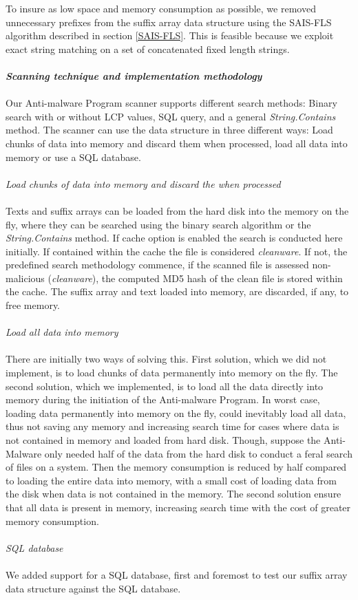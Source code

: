 \documentclass[12pt]{article} %
\begin{document}
To insure as low space and memory consumption as possible, we removed unnecessary prefixes from the suffix array data structure using the SAIS-FLS algorithm described in section \ref{SAIS-FLS}. This is feasible because we exploit exact string matching on a set of concatenated fixed length strings. 
\\ \\
\textbf{\emph{Scanning technique and implementation methodology}}
\\ \\
Our Anti-malware Program scanner supports different search methods: Binary search with or without LCP values, SQL query, and a general \emph{String.Contains} method. The scanner can use the data structure in three different ways: Load chunks of data into memory and discard them when processed, load all data into memory or use a SQL database.
\\ \\
\emph{Load chunks of data into memory and discard the when processed}
\\ \\
Texts and suffix arrays can be loaded from the hard disk into the memory on the fly, where they can be searched using the binary search algorithm or the \emph{String.Contains} method. If cache option is enabled the search is conducted here initially. If contained within the cache the file is considered \emph{cleanware}. If not, the predefined search methodology commence, if the scanned file is assessed non-malicious (\emph{cleanware}), the computed MD5 hash of the clean file is stored within the cache. The suffix array and text loaded into memory, are discarded, if any, to free memory.
\\ \\
\emph{Load all data into memory}
\\ \\
There are initially two ways of solving this. First solution, which we did not implement, is to load chunks of data permanently into memory on the fly. The second solution, which we implemented, is to load all the data directly into memory during the initiation of the Anti-malware Program. In worst case, loading data permanently into memory on the fly, could inevitably load all data, thus not saving any memory and increasing search time for cases where data is not contained in memory and loaded from hard disk. Though, suppose the Anti-Malware only needed half of the data from the hard disk to conduct a feral search of files on a system. Then the memory consumption is reduced by half compared to loading the entire data into memory, with a small cost of loading data from the disk when data is not contained in the memory. The second solution ensure that all data is present in memory, increasing search time with the cost of greater memory consumption.
\\ \\
\emph{SQL database}
\\ \\
We added support for a SQL database, first and foremost to test our suffix array data structure against the SQL database. 
\\ \\
\end{document}
